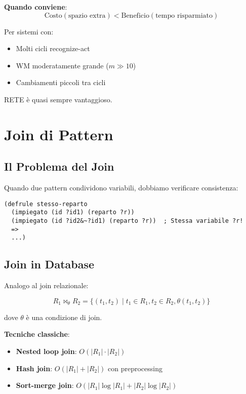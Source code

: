 \textbf{Quando conviene}:
\begin{equation}
\text{Costo}(\text{spazio extra}) < \text{Beneficio}(\text{tempo risparmiato})
\end{equation}

Per sistemi con:
\begin{itemize}
\item Molti cicli recognize-act
\item WM moderatamente grande ($m \gg 10$)
\item Cambiamenti piccoli tra cicli
\end{itemize}

RETE è quasi sempre vantaggioso.

\section{Join di Pattern}

\subsection{Il Problema del Join}

Quando due pattern condividono variabili, dobbiamo verificare consistenza:

\begin{lstlisting}[language=CLIPS]
(defrule stesso-reparto
  (impiegato (id ?id1) (reparto ?r))
  (impiegato (id ?id2&~?id1) (reparto ?r))  ; Stessa variabile ?r!
  =>
  ...)
\end{lstlisting}

\subsection{Join in Database}

Analogo al join relazionale:

\begin{equation}
R_1 \bowtie_{\theta} R_2 = \{(t_1, t_2) \mid t_1 \in R_1, t_2 \in R_2, \theta(t_1, t_2)\}
\end{equation}

dove $\theta$ è una condizione di join.

\textbf{Tecniche classiche}:
\begin{itemize}
\item \textbf{Nested loop join}: $O(|R_1| \cdot |R_2|)$
\item \textbf{Hash join}: $O(|R_1| + |R_2|)$ con preprocessing
\item \textbf{Sort-merge join}: $O(|R_1| \log |R_1| + |R_2| \log |R_2|)$
\end{itemize}

